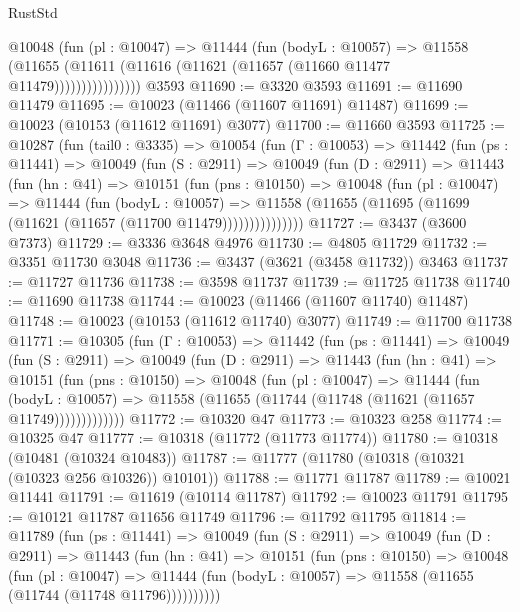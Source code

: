 \begin{lexlean}{RustStd}
\begin{coremodule}
                  @10048
                    (fun (pl : @10047) =>
                    @11444
                      (fun (bodyL : @10057) =>
                      @11558
                        (@11655
                          (@11611 (@11616 (@11621 (@11657 (@11660 @11477 @11479))))))))))))))))
    @3593
@11690 := @3320 @3593
@11691 := @11690 @11479
@11695 := @10023 (@11466 (@11607 @11691) @11487)
@11699 := @10023 (@10153 (@11612 @11691) @3077)
@11700 := @11660 @3593
@11725 := @10287
    (fun (tail0 : @3335) =>
    @10054
      (fun (Γ : @10053) =>
      @11442
        (fun (ps : @11441) =>
        @10049
          (fun (S : @2911) =>
          @10049
            (fun (D : @2911) =>
            @11443
              (fun (hn : @41) =>
              @10151
                (fun (pns : @10150) =>
                @10048
                  (fun (pl : @10047) =>
                  @11444
                    (fun (bodyL : @10057) =>
                    @11558 (@11655 (@11695 (@11699 (@11621 (@11657 (@11700 @11479)))))))))))))))
@11727 := @3437 (@3600 @7373)
@11729 := @3336 @3648 @4976
@11730 := @4805 @11729
@11732 := @3351 @11730 @3048
@11736 := @3437 (@3621 (@3458 @11732)) @3463
@11737 := @11727 @11736
@11738 := @3598 @11737
@11739 := @11725 @11738
@11740 := @11690 @11738
@11744 := @10023 (@11466 (@11607 @11740) @11487)
@11748 := @10023 (@10153 (@11612 @11740) @3077)
@11749 := @11700 @11738
@11771 := @10305
    (fun (Γ : @10053) =>
    @11442
      (fun (ps : @11441) =>
      @10049
        (fun (S : @2911) =>
        @10049
          (fun (D : @2911) =>
          @11443
            (fun (hn : @41) =>
            @10151
              (fun (pns : @10150) =>
              @10048
                (fun (pl : @10047) =>
                @11444
                  (fun (bodyL : @10057) =>
                  @11558 (@11655 (@11744 (@11748 (@11621 (@11657 @11749)))))))))))))
@11772 := @10320 @47
@11773 := @10323 @258
@11774 := @10325 @47
@11777 := @10318 (@11772 (@11773 @11774))
@11780 := @10318 (@10481 (@10324 @10483))
@11787 := @11777 (@11780 (@10318 (@10321 (@10323 @256 @10326)) @10101))
@11788 := @11771 @11787
@11789 := @10021 @11441
@11791 := @11619 (@10114 @11787)
@11792 := @10023 @11791
@11795 := @10121 @11787 @11656 @11749
@11796 := @11792 @11795
@11814 := @11789
    (fun (ps : @11441) =>
    @10049
      (fun (S : @2911) =>
      @10049
        (fun (D : @2911) =>
        @11443
          (fun (hn : @41) =>
          @10151
            (fun (pns : @10150) =>
            @10048
              (fun (pl : @10047) =>
              @11444 (fun (bodyL : @10057) => @11558 (@11655 (@11744 (@11748 @11796))))))))))

\end{coremodule}
\end{lexlean}
